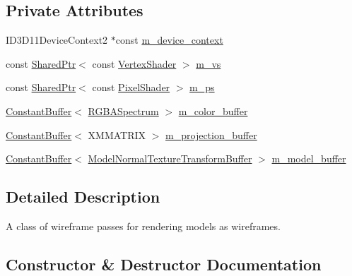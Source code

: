 \subsection*{Private Attributes}
\begin{DoxyCompactItemize}
\item 
I\+D3\+D11\+Device\+Context2 $\ast$const \hyperlink{classmage_1_1_wireframe_pass_aa3e85e2688c424fc369da6c00691d466}{m\+\_\+device\+\_\+context}
\item 
const \hyperlink{namespacemage_a1e01ae66713838a7a67d30e44c67703e}{Shared\+Ptr}$<$ const \hyperlink{classmage_1_1_vertex_shader}{Vertex\+Shader} $>$ \hyperlink{classmage_1_1_wireframe_pass_aa55de3b804055362812bcf775e0dffb4}{m\+\_\+vs}
\item 
const \hyperlink{namespacemage_a1e01ae66713838a7a67d30e44c67703e}{Shared\+Ptr}$<$ const \hyperlink{namespacemage_a27ecaf266420ee7a494d64edc0757129}{Pixel\+Shader} $>$ \hyperlink{classmage_1_1_wireframe_pass_a39577f12ad9b3f72e703c290cbf46002}{m\+\_\+ps}
\item 
\hyperlink{structmage_1_1_constant_buffer}{Constant\+Buffer}$<$ \hyperlink{structmage_1_1_r_g_b_a_spectrum}{R\+G\+B\+A\+Spectrum} $>$ \hyperlink{classmage_1_1_wireframe_pass_ab046a411db5ef3cd9c291ea1bea7cdbc}{m\+\_\+color\+\_\+buffer}
\item 
\hyperlink{structmage_1_1_constant_buffer}{Constant\+Buffer}$<$ X\+M\+M\+A\+T\+R\+IX $>$ \hyperlink{classmage_1_1_wireframe_pass_a4079c5e719beac17ef87356d3e5c322a}{m\+\_\+projection\+\_\+buffer}
\item 
\hyperlink{structmage_1_1_constant_buffer}{Constant\+Buffer}$<$ \hyperlink{structmage_1_1_model_normal_texture_transform_buffer}{Model\+Normal\+Texture\+Transform\+Buffer} $>$ \hyperlink{classmage_1_1_wireframe_pass_aa7fb7cbba08fe8b4d7defab36d2e82a7}{m\+\_\+model\+\_\+buffer}
\end{DoxyCompactItemize}


\subsection{Detailed Description}
A class of wireframe passes for rendering models as wireframes. 

\subsection{Constructor \& Destructor Documentation}
\hypertarget{classmage_1_1_wireframe_pass_a7323b3caca5d06a068a89c0333651f04}{}\label{classmage_1_1_wireframe_pass_a7323b3caca5d06a068a89c0333651f04} 
